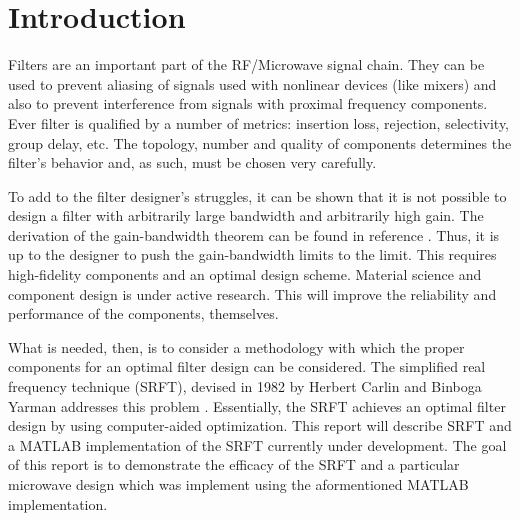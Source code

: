 \section*{Introduction}
Filters are an important part of the RF/Microwave signal chain. They can be used
to prevent aliasing of signals used with nonlinear devices (like mixers) and
also to prevent interference from signals with proximal frequency components.
Ever filter is qualified by a number of metrics: insertion loss, rejection,
selectivity, group delay, etc. The topology, number and quality of components
determines the filter's behavior and, as such, must be chosen very carefully.

To add to the filter designer's struggles, it can be shown that it is not
possible to design a filter with arbitrarily large bandwidth and arbitrarily high
gain. The derivation of the gain-bandwidth theorem can be found in reference
\cite{wcd}. Thus, it is up to the designer to push the gain-bandwidth
limits to the limit. This requires high-fidelity components and an optimal
design scheme. Material science and component design is under active research.
This will improve the reliability and performance of the components, themselves.

What is needed, then, is to consider a methodology with which the proper
components for an optimal filter design can be considered. The simplified real
frequency technique (SRFT), devised in 1982 by Herbert Carlin and Binboga Yarman
addresses this problem \cite{srft}. Essentially, the SRFT achieves an optimal
filter design by using computer-aided optimization. This report will describe
SRFT and a MATLAB\textsuperscript{\textregistered} implementation of the SRFT
currently under development. The goal of this report is to demonstrate the
efficacy of the SRFT and a particular microwave design which was implement using
the aformentioned MATLAB\textsuperscript{\textregistered} implementation.
